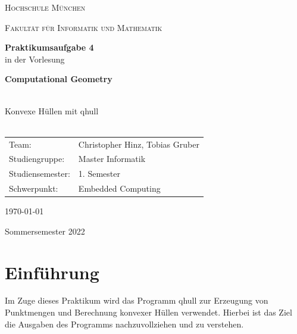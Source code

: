 \documentclass[12pt]{scrartcl}
\begin{document}
\begin{titlepage}
    \vfill
	\centering
    \vspace{1.5cm}

	{\scshape\LARGE Hochschule München \par}
    {\scshape\Large Fakultät für Informatik und Mathematik\par}
	\vspace{1.5cm}




    \vfill
    {\LARGE\bfseries Praktikumsaufgabe 4 \\}
    \vspace{0.5cm}
	{in der Vorlesung\\}
    \vspace{0.5cm}
    {\LARGE\bfseries Computational Geometry\\~\\ \par}
	{\LARGE Konvexe Hüllen mit qhull\\~\\ \par}
	\vfill
    \vfill


    \begin{tabular}{ll}
    \normalsize
    Team:  & Christopher Hinz, Tobias Gruber\\
    Studiengruppe: & Master Informatik\\
    Studiensemester: & 1. Semester\\
    Schwerpunkt: & Embedded Computing\\
    \end{tabular}
    \vspace{1.5cm}

    \today

    \vspace{0.5cm}

    Sommersemester 2022

	\vfill

\end{titlepage}

\newpage

\section{Einführung}
Im Zuge dieses Praktikum wird das Programm qhull zur Erzeugung von Punktmengen und Berechnung konvexer Hüllen verwendet. Hierbei ist das Ziel die Ausgaben des Programms nachzuvollziehen und zu verstehen.
\end{document}
